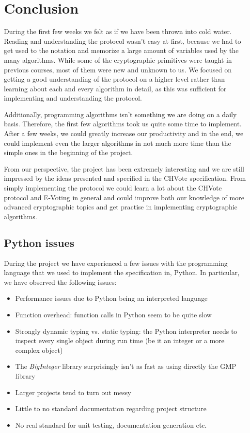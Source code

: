 \chapter{Conclusion}

During the first few weeks we felt as if we have been thrown into cold water. Reading and understanding the protocol wasn't easy at first, because we had to get used to the notation and memorize a large amount of variables used by the many algorithms. While some of the cryptographic primitives were taught in previous courses, most of them were new and unknown to us. We focused on getting a good understanding of the protocol on a higher level rather than learning about each and every algorithm in detail, as this was sufficient for implementing and understanding the protocol.

Additionally, programming algorithms isn't something we are doing on a daily basis. Therefore, the first few algorithms took us quite some time to implement. After a few weeks, we could greatly increase our productivity and in the end, we could implement even the larger algorithms in not much more time than the simple ones in the beginning of the project.

From our perspective, the project has been extremely interesting and we are still impressed by the ideas presented and specified in the CHVote specification. From simply implementing the protocol we could learn a lot about the CHVote protocol and E-Voting in general and could improve both our knowledge of more advanced cryptographic topics and get practise in implementing cryptographic algorithms.

\section{Python issues}

During the project we have experienced a few issues with the programming language that we used to implement the specification in, Python. In particular, we have observed the following issues:

\begin{itemize}
	\item Performance issues due to Python being an interpreted language
	\item Function overhead: function calls in Python seem to be quite slow
	\item Strongly dynamic typing vs. static typing: the Python interpreter needs to inspect every single object during run time (be it an integer or a more complex object)
	\item The \textit{BigInteger} library surprisingly isn't as fast as using directly the GMP library
	\item Larger projects tend to turn out messy
	\item Little to no standard documentation regarding project structure
	\item No real standard for unit testing, documentation generation etc.
\end{itemize}

